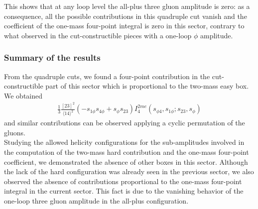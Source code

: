 This shows that at any loop level the all-plus three gluon amplitude is zero: as a consequence, all the possible contributions in this quadruple cut vanish and the coefficient of the one-mass four-point integral is zero in this sector, contrary to what observed in the cut-constructible pieces with a one-loop $\phi$ amplitude.
\subsubsection{Summary of the results}
From the quadruple cuts, we found a four-point contribution in the cut-constructible part of this sector which is proportional to the two-mass easy box. We obtained
\begin{align*}
	\frac{1}{3}\frac{[23]^2}{\langle 14 \rangle^2} (-s_{1\phi}s_{4\phi}+s_\phi s_{23})I_4^{2me}(s_{\phi 4},s_{1\phi};s_{23},s_\phi)
\end{align*}
and similar contributions can be observed applying a cyclic permutation of the gluons.\\
Studying the allowed helicity configurations for the sub-amplitudes involved in the computation of the two-mass hard contribution and the one-mass four-point coefficient, we demonstrated the absence of other boxes in this sector. Although the lack of the hard configuration was already seen in the previous sector, we also observed the absence of contributions proportional to the one-mass four-point integral in the current sector. This fact is due to the vanishing behavior of the one-loop three gluon amplitude in the all-plus configuration.

